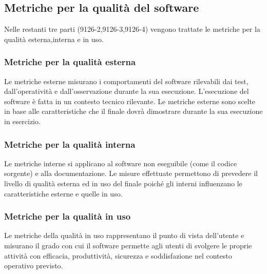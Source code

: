 \documentclass[PianoDiQualifica.tex]{subfiles}
\begin{document}
\subsection{Metriche per la qualità del software}
Nelle restanti tre parti (9126-2,9126-3,9126-4) vengono trattate le metriche per la qualità esterna,interna e in uso.

\subsubsection{Metriche per la qualità esterna}
Le metriche esterne misurano i comportamenti del software rilevabili dai test, dall’operatività e dall’osservazione durante la sua esecuzione.
L’esecuzione del software è fatta in un contesto tecnico rilevante.
Le metriche esterne sono scelte in base alle caratteristiche che il 
finale dovrà dimostrare durante la sua esecuzione in esercizio.

\subsubsection{Metriche per la qualità interna}
Le metriche interne si applicano al software non eseguibile (come il codice sorgente) e alla documentazione. Le misure effettuate permettono di prevedere il livello di qualità esterna ed in uso del  finale poiché gli  interni influenzano le caratteristiche esterne e quelle in uso.

\subsubsection{Metriche per la qualità in uso}
Le metriche della qualità in uso rappresentano il punto di vista dell'utente e misurano il grado con cui il software permette agli utenti di svolgere le proprie attività con efficacia, produttività, sicurezza e soddisfazione nel contesto operativo previsto.
\end{document}
